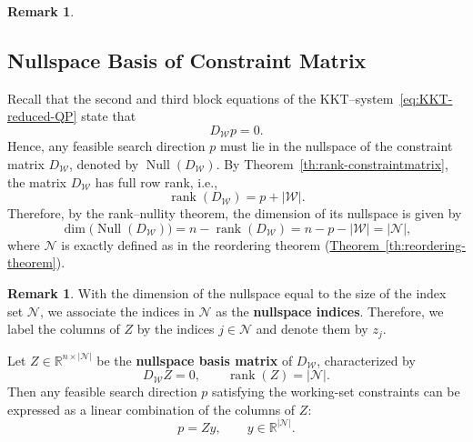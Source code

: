 \documentclass{book}
\theoremstyle{definition}
\newtheorem{remark}[theorem]{Remark}
\newcommand{\thref}[1]{\hyperref[#1]{Theorem~\ref*{#1}}}
\numberwithin{algorithm_}{chapter}
\begin{document}
{\begin{remark}
\end{remark}

\subsection{Nullspace Basis of Constraint Matrix}

 
Recall that the second and third block equations of the KKT--system~\eqref{eq:KKT-reduced-QP} state that
\[
D_{\mathcal{W}} p = 0.
\]
Hence, any feasible search direction \(p\) must lie in the nullspace of the constraint matrix \(D_{\mathcal{W}}\), denoted by \(\operatorname{Null}(D_{\mathcal{W}})\).
By Theorem~\ref{th:rank-constraintmatrix}, the matrix \(D_{\mathcal{W}}\) has full row rank, i.e.,
\[
\operatorname{rank}(D_{\mathcal{W}}) = p + |\mathcal{W}|.
\]
Therefore, by the rank--nullity theorem, the dimension of its nullspace is given by
\begin{equation} \label{eq:nullspace-dimension}
\dim\!\bigl(\operatorname{Null}(D_{\mathcal{W}})\bigr)
=
n - \operatorname{rank}(D_{\mathcal{W}})
=
n - p - |\mathcal{W}|
=
|\mathcal{N}|,
\end{equation}
where \(\mathcal{N}\) is exactly defined as in the reordering theorem (\thref{th:reordering-theorem}).

\begin{remark} \label{rem:label-nullvector}
With the dimension of the nullspace equal to the size of the index set $\mathcal{N}$, we associate the indices in $\mathcal{N}$ as the \textbf{nullspace indices}. Therefore, we label the columns of $Z$ by the indices $j \in \mathcal{N}$ and denote them by $z_j$.  
\end{remark}

\newpage

Let $Z \in \mathbb{R}^{n \times |\mathcal{N}|}$ be the \textbf{nullspace basis matrix} of \(D_{\mathcal{W}}\), characterized by
\begin{equation} \label{eq:nullspace-basis-definition}
D_{\mathcal{W}} Z = 0,
\qquad
\operatorname{rank}(Z) = |\mathcal{N}|.
\end{equation}
Then any feasible search direction \(p\) satisfying the working-set constraints can be expressed as a linear combination of the columns of \(Z\):
\begin{equation} \label{eq:p-nullspace-representation}
p = Z y,
\qquad
y \in \mathbb{R}^{|\mathcal{N}|}.
\end{equation}

\medskip

}
\end{document}
